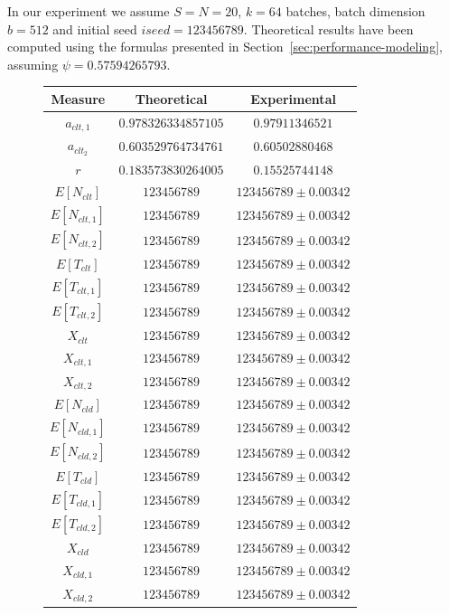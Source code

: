 In our experiment we assume $S=N=20$, $k=64$ batches, batch dimension $b=512$ and initial seed $iseed=123456789$.
%
Theoretical results have been computed using the formulas presented in Section~\ref{sec:performance-modeling}, assuming $\psi=0.57594265793$.

\begin{figure}
	\begin{center}
		\begin{tabular}{|c||c|c|}
			\hline
			Measure & Theoretical & Experimental\\
			\hline
			$a_{clt,1}$  & $0.978326334857105$ & $0.97911346521$ \\
			$a_{clt_2}$  & $0.603529764734761$ & $0.60502880468$ \\
			$r$          & $0.183573830264005$ & $0.15525744148$ \\
			\hline
			$E[N_{clt}]$  & $123456789$ & $123456789\pm 0.00342$ \\
			$E[N_{clt,1}]$  & $123456789$ & $123456789\pm 0.00342$ \\
			$E[N_{clt,2}]$  & $123456789$ & $123456789\pm 0.00342$ \\
			$E[T_{clt}]$  & $123456789$ & $123456789\pm 0.00342$ \\
			$E[T_{clt,1}]$  & $123456789$ & $123456789\pm 0.00342$ \\
			$E[T_{clt,2}]$  & $123456789$ & $123456789\pm 0.00342$ \\
			$X_{clt}$  & $123456789$ & $123456789\pm 0.00342$ \\
			$X_{clt,1}$  & $123456789$ & $123456789\pm 0.00342$ \\
			$X_{clt,2}$  & $123456789$ & $123456789\pm 0.00342$ \\
			\hline
			$E[N_{cld}]$  & $123456789$ & $123456789\pm 0.00342$ \\
			$E[N_{cld,1}]$  & $123456789$ & $123456789\pm 0.00342$ \\
			$E[N_{cld,2}]$  & $123456789$ & $123456789\pm 0.00342$ \\
			$E[T_{cld}]$  & $123456789$ & $123456789\pm 0.00342$ \\
			$E[T_{cld,1}]$  & $123456789$ & $123456789\pm 0.00342$ \\
			$E[T_{cld,2}]$  & $123456789$ & $123456789\pm 0.00342$ \\
			$X_{cld}$  & $123456789$ & $123456789\pm 0.00342$ \\
			$X_{cld,1}$  & $123456789$ & $123456789\pm 0.00342$ \\
			$X_{cld,2}$  & $123456789$ & $123456789\pm 0.00342$ \\

\end{tabular}
\end{center}
\end{figure}
